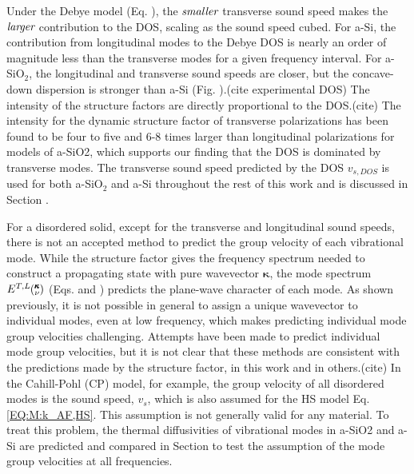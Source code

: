 \documentclass[aps,prb,twocolumn,superscriptaddress,footinbib,amsmath,amssymb,floatfix]{revtex4}
\newcommand{\kv}{\mspace{-4.0mu}\left(\mspace{-8.0mu}
\begin{smallmatrix}&\pmb{\kappa} \\&\nu\end{smallmatrix}
\mspace{-3.0mu}\right)}
\begin{document}
Under the Debye model (Eq. ), the $\emph{smaller}$ transverse sound speed 
makes the $\emph{larger}$ contribution to the DOS, scaling as the sound 
speed cubed. For a-Si, 
the contribution from longitudinal modes to the Debye DOS is nearly 
an order of magnitude less than the transverse modes for a given 
frequency interval. For a-SiO$_2$, the longitudinal and transverse 
sound speeds are closer, but the concave-down dispersion 
is stronger than a-Si (Fig. ).(cite experimental DOS) 
The intensity of the structure factors  
are directly proportional to the DOS.(cite)
The intensity for the dynamic structure factor of transverse 
polarizations has been found to be four to five\cite{taraskin_phonons_1997} 
and 6-8\cite{horbach_high_2001} times larger than longitudinal 
polarizations for models 
of a-SiO2, which supports our finding that the DOS is dominated 
by transverse modes. 
The transverse sound speed predicted by the DOS $v_{s,DOS}$ is used for both 
a-SiO$_2$ and a-Si throughout the rest of this work and is discussed 
in Section .

For a disordered solid, 
except for the transverse and longitudinal sound speeds, there is not an 
accepted method to predict the group velocity of each  
vibrational mode. 
While the structure factor gives the frequency spectrum needed to 
construct a propagating state with pure wavevector $\pmb{\kappa}$, 
the mode spectrum $E^{T,L}\kv$ (Eqs. and ) predicts the plane-wave 
character of each mode. As shown previously, it is not possible 
in general 
to assign a unique wavevector to individual modes, even at low frequency,
\cite{biswas_vibrational_1988,feldman_thermal_1993,silbert_normal_2009} 
which makes predicting individual mode group velocities challenging. 
Attempts have been made to predict individual mode group velocities,
\cite{cahill_lattice_1988,duda_reducing_2011,donadio_atomistic_2009,
he_heat_2011,he_thermal_2011,hori_phonon_2013} 
but 
it is not clear that these methods are consistent with the predictions 
made by the structure factor, in this work and in others.(cite) 
In the Cahill-Pohl (CP) model, for example, the group velocity of 
all disordered modes is the sound speed, $v_s$, which is also assumed  
for the HS model Eq. \eqref{EQ:M:k_AF,HS}.
\cite{cahill_lattice_1988} This assumption is not generally valid  
for any material.\cite{feldman_numerical_1999,duda_reducing_2011,
donadio_atomistic_2009,he_heat_2011,he_thermal_2011,larkin_predicting_2013}
To treat this problem, the thermal diffusivities of 
vibrational modes in a-SiO2 and a-Si 
are predicted and compared in Section  to test the assumption of the 
mode group velocities at all frequencies. 
\end{document}
